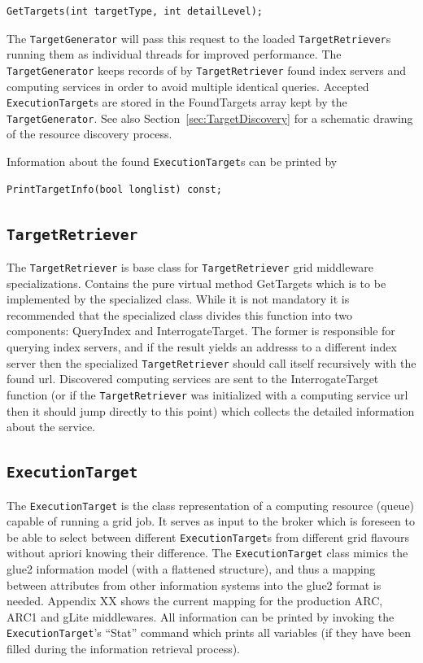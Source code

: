 \documentclass{book}
\newcommand{\TargetGenerator}{\texttt{TargetGenerator}}
\newcommand{\TargetRetriever}{\texttt{TargetRetriever}}
\newcommand{\ExecutionTarget}{\texttt{ExecutionTarget}}
\begin{document}
\begin{shaded}
\begin{verbatim}
GetTargets(int targetType, int detailLevel);
\end{verbatim}
\end{shaded}

The {\TargetGenerator} will pass this request to the loaded {\TargetRetriever}s running them as individual threads 
for improved performance. The {\TargetGenerator} keeps records of by {\TargetRetriever} found index servers and computing 
services in order to avoid multiple identical queries. Accepted {\ExecutionTarget}s are stored in the FoundTargets 
array kept by the {\TargetGenerator}. See also Section~\ref{sec:TargetDiscovery} for a schematic drawing of the 
resource discovery process.

Information about the found {\ExecutionTarget}s can be printed by 

\begin{shaded}
\begin{verbatim}
PrintTargetInfo(bool longlist) const;
\end{verbatim}
\end{shaded}

\subsection{{\TargetRetriever}} The {\TargetRetriever} is base class for {\TargetRetriever} grid middleware specializations. Contains the pure 
virtual method GetTargets which is to be implemented by the specialized class. While it is not mandatory it is recommended 
that the specialized class divides this function into two components: QueryIndex and InterrogateTarget. The former is 
responsible for querying index servers, and if the result yields an addresss to a different index server then the 
specialized {\TargetRetriever} should call itself recursively with the found url. Discovered computing services are sent 
to the InterrogateTarget function (or if the {\TargetRetriever} was initialized with a computing service url then it should 
jump directly to this point) which collects the detailed information about the service.

\subsection{{\ExecutionTarget}} The {\ExecutionTarget} is the class representation of a computing resource (queue) capable of running a grid job. It
serves as input to the broker which is foreseen to be able to select between different {\ExecutionTarget}s from different 
grid flavours without apriori knowing their difference. The {\ExecutionTarget} class mimics the glue2 information model (with 
a flattened structure), and thus a mapping between attributes from other information systems into the glue2 format is needed. 
Appendix XX shows the current mapping for the production ARC, ARC1 and gLite middlewares. All information can be printed by 
invoking the {\ExecutionTarget}'s ``Stat'' command which prints all variables (if they have been filled during the information 
retrieval process).
\end{document}

